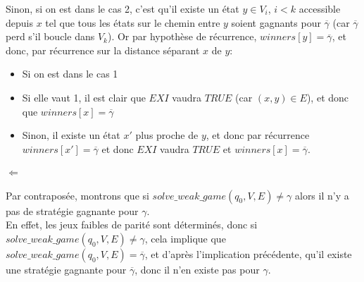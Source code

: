 \documentclass[10pt,a4paper]{article}
\begin{document}
Sinon, si on est dans le cas 2, c'est qu'il existe un état $y \in V_i$, $ i < k$ accessible depuis $x$ tel que tous les états sur le chemin entre $y$ soient gagnants pour $\overline{\gamma}$ (car $\overline{\gamma}$ perd s'il boucle dans $V_k$). Or par hypothèse de récurrence, $winners[y] = \overline{\gamma}$, et donc, par récurrence sur la distance séparant $x$ de $y$:
\begin{itemize}
	\item Si on est dans le cas 1
	\item Si elle vaut 1, il est clair que $EXI$ vaudra $TRUE$ (car $(x,y) \in E$), et donc que $winners[x] = \overline{\gamma}$
	\item Sinon, il existe un état $x'$ plus proche de $y$, et donc par récurrence $winners[x'] = \overline{\gamma}$ et donc $EXI$ vaudra $TRUE$ et $winners[x] = \overline{\gamma}$.
\end{itemize}

\paragraph{$\Longleftarrow$}
Par contraposée, montrons que si $solve\_weak\_game(q_0,V,E) \neq \gamma$ alors il n'y a pas de stratégie gagnante pour $\gamma$.\\
En effet, les jeux faibles de parité sont déterminés, donc si $solve\_weak\_game(q_0,V,E) \neq \gamma$, cela implique que $solve\_weak\_game(q_0,V,E) = \overline{\gamma}$, et d'après l'implication précédente, qu'il existe une stratégie gagnante pour $\overline{\gamma}$, donc il n'en existe pas pour $\gamma$.
\end{document}
